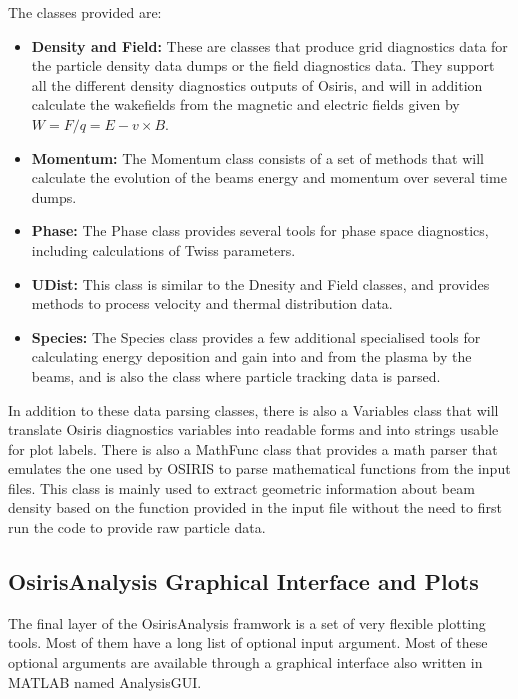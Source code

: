 The classes provided are:

\begin{itemize}
    \item \textbf{Density and Field:} These are classes that produce grid diagnostics data for the particle density data dumps or the field diagnostics data. They support all the different density diagnostics outputs of Osiris, and will in addition calculate the wakefields from the magnetic and electric fields given by $W = F/q = E - v \times B$.
    \item \textbf{Momentum:} The Momentum class consists of a set of methods that will calculate the evolution of the beams energy and momentum over several time dumps.
    \item \textbf{Phase:} The Phase class provides several tools for phase space diagnostics, including calculations of Twiss parameters.
    \item \textbf{UDist:} This class is similar to the Dnesity and Field classes, and provides methods to process velocity and thermal distribution data.
    \item \textbf{Species:} The Species class provides a few additional specialised tools for calculating energy deposition and gain into and from the plasma by the beams, and is also the class where particle tracking data is parsed.
\end{itemize}

In addition to these data parsing classes, there is also a Variables class that will translate Osiris diagnostics variables into readable forms and into strings usable for plot labels. There is also a MathFunc class that provides a math parser that emulates the one used by OSIRIS to parse mathematical functions from the input files. This class is mainly used to extract geometric information about beam density based on the function provided in the input file without the need to first run the code to provide raw particle data.

\subsection{OsirisAnalysis Graphical Interface and Plots}
\label{Tools:OALay3}

The final layer of the OsirisAnalysis framwork is a set of very flexible plotting tools. Most of them have a long list of optional input argument. Most of these optional arguments are available through a graphical interface also written in MATLAB named AnalysisGUI.

